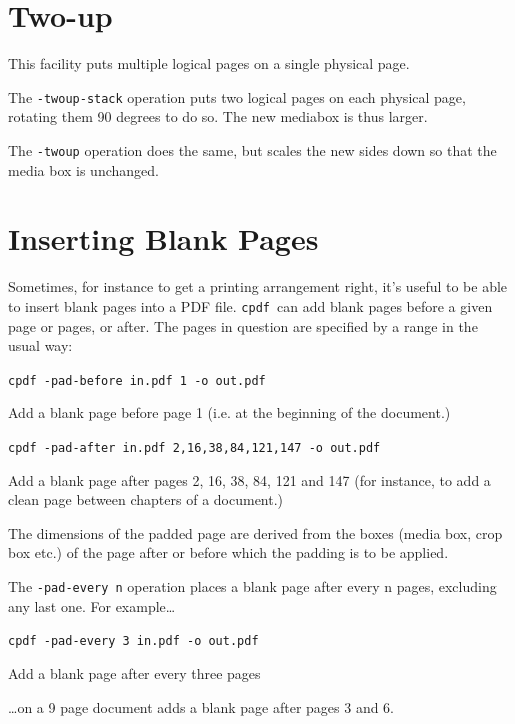 \documentclass[a4paper,makeidx]{memoir}
\newcommand{\cpdf}{\texttt{cpdf}}
\begin{document}
  \section{Two-up}
    This facility puts multiple logical pages on a single physical page. 

The \texttt{-twoup-stack} operation puts two logical pages on each physical
page, rotating them 90 degrees to do so. The new mediabox is thus larger.

The \texttt{-twoup} operation does the same, but scales the new sides down so
that the media box is unchanged.

  \section{Inserting Blank Pages}
  Sometimes, for instance to get a printing arrangement right, it's useful to
be able to insert blank pages into a PDF file. \cpdf\ can add blank pages
before a given page or pages, or after. The pages in question are specified by
a range in the usual way:
  \begin{framed}
    \small\verb!cpdf -pad-before in.pdf 1 -o out.pdf!
 
    \vspace{2.5mm}
    \noindent Add a blank page before page 1 (i.e. at the beginning of the document.)

    \vspace{2.5mm}
    \verb!cpdf -pad-after in.pdf 2,16,38,84,121,147 -o out.pdf!

    \vspace{2.5mm}
    \noindent Add a blank page after pages 2, 16, 38, 84, 121 and 147 (for
instance, to add a clean page between chapters of a document.)
  \end{framed}
  \noindent The dimensions of the padded page are derived from the boxes (media box, crop box etc.) of the page after or before which the padding is to be applied.

  The \verb!-pad-every n! operation places a blank page after every n pages, excluding any last one. For example\ldots
  \begin{framed}
    \small\verb!cpdf -pad-every 3 in.pdf -o out.pdf!
 
    \vspace{2.5mm}
    \noindent Add a blank page after every three pages
  \end{framed}
  \noindent\ldots on a 9 page document adds a blank page after pages 3 and 6.
\end{document}

